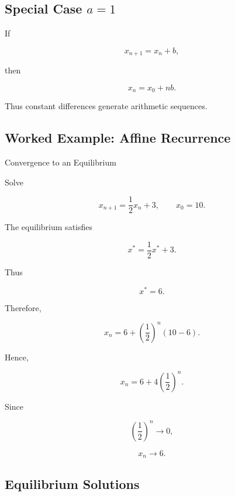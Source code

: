 \subsection{Special Case \(a=1\)}
\label{subsec:first-order-a-equals-one}

If

\[
x_{n+1}=x_n+b,
\]

then

\[
\boxed{
x_n=x_0+nb.
}
\]

Thus constant differences generate arithmetic sequences.

\subsection{Worked Example: Affine Recurrence}
\label{subsec:worked-affine-recurrence}

\begin{workedexamplebox}{Convergence to an Equilibrium}

Solve

\[
x_{n+1}
=
\frac12x_n+3,
\qquad
x_0=10.
\]

The equilibrium satisfies

\[
x^*
=
\frac12x^*+3.
\]

Thus

\[
x^*=6.
\]

Therefore,

\[
x_n
=
6
+
\left(
\frac12
\right)^n
(10-6).
\]

Hence,

\begin{answerbox}
\[
\boxed{
x_n
=
6
+
4
\left(
\frac12
\right)^n.
}
\]

Since

\[
\left(
\frac12
\right)^n\to0,
\]

\[
\boxed{
x_n\to6.
}
\]
\end{answerbox}

\end{workedexamplebox}

\subsection{Equilibrium Solutions}
\label{subsec:difference-equation-equilibria}

